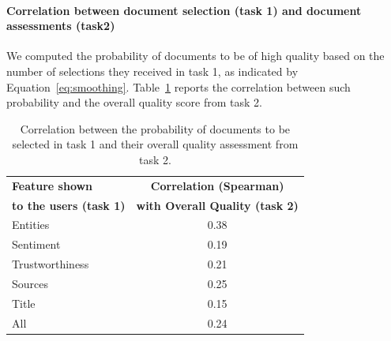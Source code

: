 \documentclass{llncs}
\begin{document}
\paragraph{Correlation between document selection (task 1) and document assessments (task2)}
We computed the probability of documents to be of high quality based on the number of selections they received in task 1, as indicated by Equation~\eqref{eq:smoothing}.
Table~\ref{tab:t1t2corrm} reports the correlation between such probability and the overall quality score from task 2.

\begin{table}
\centering
\caption{Correlation between the probability of documents to be selected in task 1 and their overall quality assessment from task 2.\label{tab:t1t2corrm}}
\begin{tabular}{|l|c|}
\hline
{\bf Feature shown } & {\bf Correlation (Spearman)}  \\
{\bf to the users (task 1)} & {\bf with Overall Quality (task 2)}\\
\hline
Entities & 0.38 \\ \hline
Sentiment & 0.19 \\ \hline
Trustworthiness & 0.21 \\ \hline
Sources & 0.25 \\ \hline
Title & 0.15 \\ \hline
All & 0.24 \\ \hline
\end{tabular}
\end{table}
\end{document}
